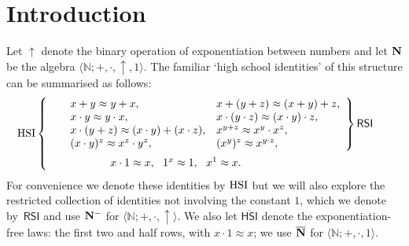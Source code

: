 \documentclass[eqnor,reqno]{amsart}
\theoremstyle{plain}
\theoremstyle{definition}
\newcommand{\HSI}{\textsf{HSI}}
\newcommand{\RSI}{\textsf{RSI}}
\begin{document}
\maketitle

\section{Introduction}\label{sec:intro}
\maketitle

Let $\uparrow$ denote the binary operation of exponentiation between
numbers and let
${\bf N}$ be the algebra $\langle\mathbb{N};+,\cdot,\uparrow,1\rangle$.  The familiar `high
school identities' of this structure can
be summarised as follows:
\[
{\rm HSI}\left\{\begin{array}{ccc}
&\left.\begin{array}{cc}
x+y \approx y+x,\hfill&
x+(y+z)
\approx (x+y)+z,\hfill\\
x \cdot y \approx y \cdot x, \hfill &x \cdot (y \cdot z) \approx (x \cdot y) 
	\cdot z,\hfill\\
x \cdot (y+z) \approx (x \cdot y)+(x
\cdot z),\hfill& x^{y+z} \approx x^y \cdot x^z,\hfill\\
(x \cdot y)^z \approx {x^z} \cdot {y^z},\hfill&
(x^y)^z \approx x^{y \cdot z},\hfill
\end{array}\right\}\RSI\vspace{.2cm}\\
&\hspace{1.5cm} x \cdot 1
\approx x,\
\
	1^x \approx 1,\  \ x^1 \approx x.\hfill &
\end{array}\right.
\]
For convenience we denote these identities by
${\rm HSI}$ but we will also explore the restricted collection of identities not involving the
constant $1$, which we denote by~$\RSI$ and use ${\bf N}^-$ for $\langle\mathbb{N};+,\cdot,\uparrow\rangle$.
We also let $\overline{\HSI}$ denote the exponentiation-free laws: the first two and half rows, with $x\cdot 1\approx x$; we use $\overline{\bf N}$ for $\langle\mathbb{N};+,\cdot,1\rangle$.
\end{document}
